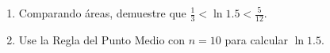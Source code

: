 \item 
    \begin{enumerate}
        \item[(a)] Comparando áreas, demuestre que $\frac{1}{3} < \ln 1.5 < \frac{5}{12}$.
        \item[(b)] Use la Regla del Punto Medio con $n = 10$ para calcular $\ln 1.5$.
    \end{enumerate}
